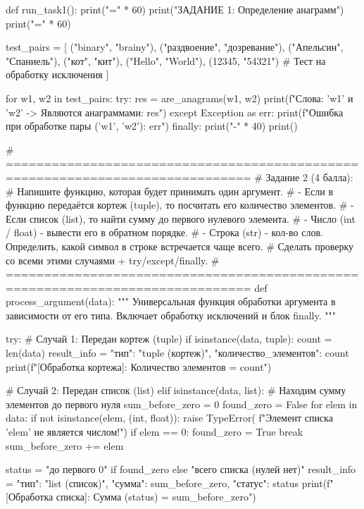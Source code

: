 \documentclass[14pt,a4paper]{extarticle}
\begin{document}
\begin{CodeListing}
def run_task1():
    print("=" * 60)
    print("ЗАДАНИЕ 1: Определение анаграмм")
    print("=" * 60)

    test_pairs = [
        ("binary", "brainy"),
        ("раздвоение", "дозревание"),
        ("Апельсин", "Спаниель"),
        ("кот", "кит"),
        ("Hello", "World"),
        (12345, "54321")  # Тест на обработку исключения
    ]

    for w1, w2 in test_pairs:
        try:
            res = are_anagrams(w1, w2)
            print(f"Слова: '{w1}' и '{w2}' -> Являются анаграммами: {res}")
        except Exception as err:
            print(f"Ошибка при обработке пары ('{w1}', '{w2}'): {err}")
        finally:
            print("-" * 40)
    print()


# ==============================================================================
# Задание 2 (4 балла):
# Напишите функцию, которая будет принимать один аргумент.
# - Если в функцию передаётся кортеж (tuple), то посчитать его количество элементов.
# - Если список (list), то найти сумму до первого нулевого элемента.
# - Число (int / float) - вывести его в обратном порядке.
# - Строка (str) - кол-во слов. Определить, какой символ в строке встречается чаще всего.
# Сделать проверку со всеми этими случаями + try/except/finally.
# ==============================================================================
def process_argument(data):
    """
    Универсальная функция обработки аргумента в зависимости от его типа.
    Включает обработку исключений и блок finally.
    """

    try:
        # Случай 1: Передан кортеж (tuple)
        if isinstance(data, tuple):
            count = len(data)
            result_info = {
                "тип": "tuple (кортеж)",
                "количество_элементов": count
            }
            print(f"[Обработка кортежа]: Количество элементов = {count}")

        # Случай 2: Передан список (list)
        elif isinstance(data, list):
            # Находим сумму элементов до первого нуля
            sum_before_zero = 0
            found_zero = False
            for elem in data:
                if not isinstance(elem, (int, float)):
                    raise TypeError(
                        f"Элемент списка '{elem}' не является числом!")
                if elem == 0:
                    found_zero = True
                    break
                sum_before_zero += elem

            status = "до первого 0" if found_zero else "всего списка (нулей нет)"
            result_info = {
                "тип": "list (список)",
                "сумма": sum_before_zero,
                "статус": status
            }
            print(f"[Обработка списка]: Сумма ({status}) = {sum_before_zero}")


\end{CodeListing}
\end{document}
